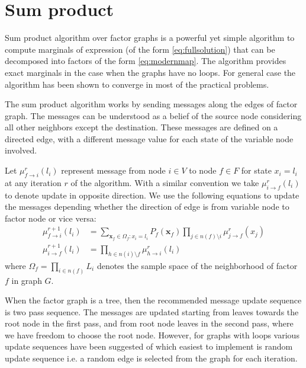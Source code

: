 \documentclass[letterpaper, 10 pt, conference]{ieeeconf} %
\newcommand{\vect}[1]{\mathbf{#1}}
\begin{document}
\section{Sum product}
\newcommand{\msg}[4]{\mu^{#4}_{#1\rightarrow#2}(#3)}
% 
Sum product algorithm over factor graphs \cite{kschischang2001factor} is a
powerful yet simple algorithm to compute marginals  of
expression (of the form \eqref{eq:fullsolution}) that can be decomposed into
factors of the form \eqref{eq:modernmap}. The algorithm provides exact
marginals in the case when the graphs have no loops. For general case the
algorithm has been shown %
to converge in most of the practical problems.
 
The sum product algorithm works by sending messages along the edges of factor
graph. The messages can be understood as a belief of the source node
considering all other neighbors except the destination. These messages are
defined on a directed edge, with a different message value for each state of
the variable node involved. 

Let $\msg{f}{i}{l_i}{r}$ represent message from
node $i \in V$ to node $f \in F$ for state $x_i = l_i$ at any iteration $r$ of the
algorithm. With a similar convention we take $\msg{i}{f}{l_i}{r}$ to denote
update in opposite direction. We use the following equations to update the messages depending whether the direction of edge is from variable node to factor node or vice versa:
\begin{align}
  \msg{f}{i}{l_i}{r+1} &= \sum_{\vect{x}_f \in \Omega_f: x_i = l_i}P_f(\vect{x}_f)\prod_{j \in n(f) \setminus i}\msg{j}{f}{x_j}{r}
  \label{eq:factor2node}
  \\
  \msg{i}{f}{l_i}{r+1} &= \prod_{h \in n(i) \setminus f}\msg{h}{i}{l_i}{r}
  \label{eq:node2factor}
\end{align}
where $\Omega_f = \prod_{i \in n(f)} L_i$ denotes the sample space of the neighborhood of factor $f$ in graph $G$.

When the factor graph is a tree, then the recommended message update sequence
is two pass sequence. The messages are updated starting from leaves towards the
root node in the first pass, and from root node leaves in the second pass,
where we have freedom to choose the root node. However, for graphs with loops
various update sequences have been suggested of which easiest to implement is
random update sequence i.e. a random edge is selected from the graph for each iteration.
\end{document}
